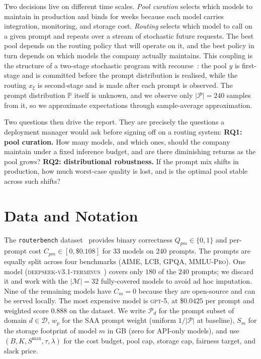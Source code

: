 \documentclass[11pt]{article}
\newcommand{\pP}{\mathcal{P}}\newcommand{\pM}{\mathcal{M}}
\newcommand{\pD}{\mathcal{D}}\newcommand{\pU}{\mathcal{U}}
\begin{document}
Two decisions live on different time scales. \emph{Pool curation} selects
which models to maintain in production and binds for weeks because each
model carries integration, monitoring, and storage cost. \emph{Routing}
selects which model to call on a given prompt and repeats over a stream of
stochastic future requests. The best pool depends on the routing policy
that will operate on it, and the best policy in turn depends on which
models the company actually maintains. This coupling is the structure of a
two-stage stochastic program with recourse~\citep{birge1997introduction}:
the pool $y$ is first-stage and is committed before the prompt distribution
is realised, while the routing $x_\xi$ is second-stage and is made after
each prompt is observed. The prompt distribution $\mathbb{P}$ itself is
unknown, and we observe only $|\pP|=240$ samples from it, so we approximate
expectations through sample-average approximation.

Two questions then drive the report. They are precisely the questions a
deployment manager would ask before signing off on a routing system:
\textbf{RQ1: pool curation.} How many models, and which ones, should the
company maintain under a fixed inference budget, and are there diminishing
returns as the pool grows? \textbf{RQ2: distributional robustness.} If the
prompt mix shifts in production, how much worst-case quality is lost, and
is the optimal pool stable across such shifts?

\section{Data and Notation}
\label{sec:data}

The \texttt{routerbench} dataset~\citep{li2026routerbench} provides binary
correctness $Q_{pm}\in\{0,1\}$ and per-prompt cost $C_{pm}\in[0,\$0.108]$
for $33$ models on $240$ prompts. The prompts are equally split across four benchmarks
(\textsc{AIME, LCB, GPQA, MMLU-Pro}). One model
(\textsc{deepseek-v3.1-terminus}~\citep{liu2024deepseek}) covers only $180$
of the $240$ prompts; we discard it and work with the $|\pM|=32$
fully-covered models to avoid ad hoc imputation. Nine of the remaining models have $C_m=0$ because they are
open-source and can be served locally. The most expensive model is
\textsc{gpt-5}, at \$$0.0425$ per prompt and weighted score $0.888$ on the
dataset. We write $\pP_d$ for the prompt subset of domain $d\in\pD$, $w_p$ for
the SAA prompt weight (uniform $1/|\pP|$ at baseline), $S_m$ for the storage
footprint of model $m$ in GB (zero for API-only models), and use
$(B,K,S^{\max},\tau,\lambda)$ for the cost budget, pool cap, storage cap,
fairness target, and slack price.
\end{document}
